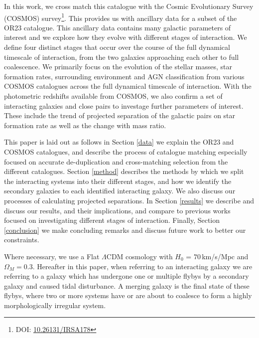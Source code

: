\documentclass[fleqn,usenatbib]{mnras}
\begin{document}
In this work, we cross match this catalogue with the Cosmic Evolutionary Survey (COSMOS) survey\footnote{DOI: \href{https://www.ipac.caltech.edu/doi/irsa/10.26131/IRSA178}{10.26131/IRSA178}}. This provides us with ancillary data for a subset of the OR23 catalogue. This ancillary data contains many galactic parameters of interest and we explore how they evolve with different stages of interaction. We define four distinct stages that occur over the course of the full dynamical timescale of interaction, from the two galaxies approaching each other to full coalescence. We primarily focus on the evolution of the stellar masses, star formation rates, surrounding environment and AGN classification from various COSMOS catalogues across the full dynamical timescale of interaction. With the photometric redshifts available from COSMOS, we also confirm a set of interacting galaxies and close pairs to investage further parameters of interest. These include the trend of projected separation of the galactic pairs on star formation rate as well as the change with mass ratio.


This paper is laid out as follows in Section \ref{data} we explain the OR23 and COSMOS catalogues, and describe the process of catalogue matching especially focused on accurate de-duplication and cross-matching selection from the different catalogues.  Section \ref{method} describes the methods by which we split the interacting systems into their different stages, and how we identify the secondary galaxies to each identified interacting galaxy. We also discuss our processes of calculating projected separations. In Section \ref{results} we describe and discuss our results, and their implications, and compare to previous works focused on investigating different stages of interaction. Finally, Section \ref{conclusion} we make concluding remarks and discuss future work to better our constraints. 

Where necessary, we use a Flat $\Lambda$CDM cosmology with $H_0$ = $70$\,km/s/Mpc and $\Omega_M = 0.3$. Hereafter in this paper, when referring to an interacting galaxy we are referring to a galaxy which has undergone one or multiple flybys by a secondary galaxy and caused tidal disturbance. A merging galaxy is the final state of these flybys, where two or more systems have or are about to coalesce to form a highly morphologically irregular system.
\end{document}
